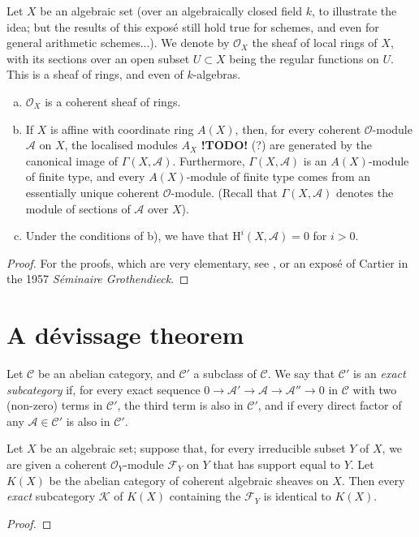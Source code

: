 \documentclass[11pt]{article}
\theoremstyle{plain}
\newenvironment{theorem}[1]
  {\renewcommand\theinnercustomtheorem{#1}\innercustomtheorem}
  {\endinnercustomtheorem}
\theoremstyle{definition}
\newenvironment{definition}[1]
  {\renewcommand\theinnercustomdefinition{#1}\innercustomdefinition}
  {\endinnercustomdefinition}
\newcommand{\sh}{\mathscr}
\newcommand{\cat}{\mathcal}
\newcommand{\HH}{\mathrm{H}}
\newcommand{\todo}{\textbf{ !TODO! }}
\newcommand{\oldpage}[1]{\marginpar{\textit{p.~#1}}}
\begin{document}
Let $X$ be an algebraic set (over an algebraically closed field $k$, to illustrate the idea; but the results of this exposé still hold true for schemes, and even for general arithmetic schemes...).
We denote by $\sh{O}_X$ the sheaf of local rings of $X$, with its sections over an open subset $U\subset X$ being the regular functions on $U$.
This is a sheaf of rings, and even of $k$-algebras.

\begin{theorem}{1}
\label{theorem1}
\begin{enumerate}[a)]
  \item $\sh{O}_X$ is a coherent sheaf of rings.
  \item If $X$ is affine with coordinate ring $A(X)$, then, for every coherent $\sh{O}$-module $\sh{A}$ on $X$, the localised modules $A_X$ \todo(?) are generated by the canonical image of $\Gamma(X,\sh{A})$.
    Furthermore, $\Gamma(X,\sh{A})$ is an $A(X)$-module of finite type, and every $A(X)$-module of finite type comes from an essentially unique coherent $\sh{O}$-module.
    (Recall that $\Gamma(X,\sh{A})$ denotes the module of sections of $\sh{A}$ over $X$).
  \item Under the conditions of b), we have that $\HH^i(X,\sh{A})=0$ for $i>0$.
\oldpage{2-02}
\end{enumerate}
\end{theorem}

\begin{proof}
  For the proofs, which are very elementary, see \cite[chapitre~2, paragraphes~2,3,4]{1}, or an exposé of Cartier in the 1957 \emph{Séminaire Grothendieck}.
\end{proof}


\section{A dévissage theorem}

\begin{definition}{1}
\label{definition1}
  Let $\cat{C}$ be an abelian category, and $\cat{C}'$ a subclass of $\cat{C}$.
  We say that $\cat{C}'$ is an \emph{exact subcategory} if, for every exact sequence $0\to\sh{A}'\to\sh{A}\to\sh{A}''\to0$ in $\cat{C}$ with two (non-zero) terms in $\cat{C}'$, the third term is also in $\cat{C}'$, and if every direct factor of any $\sh{A}\in\cat{C}'$ is also in $\cat{C}'$.
\end{definition}

\begin{theorem}{2}
\label{theorem2}
  Let $X$ be an algebraic set;
  suppose that, for every irreducible subset $Y$ of $X$, we are given a coherent $\sh{O}_Y$-module $\sh{F}_Y$ on $Y$ that has support equal to $Y$.
  Let $K(X)$ be the abelian category of coherent algebraic sheaves on $X$.
  Then every \emph{exact} subcategory $\cat{K}$ of $K(X)$ containing the $\sh{F}_Y$ is identical to $K(X)$.
\end{theorem}

\begin{proof}
  
\end{proof}



\nocite{*}


\end{document}
